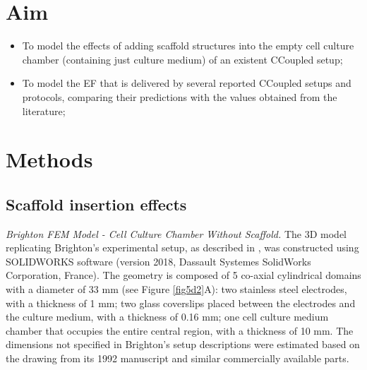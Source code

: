 \section{Aim}
\begin{itemize}
\item To model the effects of adding scaffold structures into the empty cell culture chamber (containing just culture medium) of an existent \acs{CCoupled} setup;
\item To model the \acs{EF} that is delivered by several reported \acs{CCoupled} setups and protocols, comparing their predictions with the values obtained from the literature;
\end{itemize}




\section{Methods}




\subsection{Scaffold insertion effects}

\textit{Brighton \acs{FEM} Model - Cell Culture Chamber Without Scaffold.} The \acs{3D} model replicating Brighton's experimental setup, as described in \cite{Brighton1988-vc, Brighton1992-gg}, was constructed using SOLIDWORKS software (version 2018, Dassault Systemes SolidWorks Corporation, France). The geometry is composed of 5 co-axial cylindrical domains with a diameter of 33 \si{\milli\meter} (see Figure \ref{fig5d2}A): two stainless steel electrodes, with a thickness of 1 \si{\milli\meter}; two glass coverslips placed between the electrodes and the culture medium, with a thickness of 0.16 \si{\milli\meter}; one cell culture medium chamber that occupies the entire central region, with a thickness of 10 \si{\milli\meter}. The dimensions not specified in Brighton's setup descriptions were estimated based on the drawing from its 1992 manuscript \cite{Brighton1992-gg} and similar commercially available parts. \hfill \break


